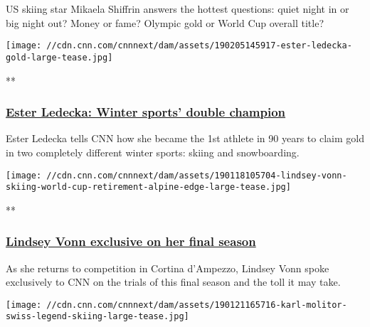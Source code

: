 US skiing star Mikaela Shiffrin answers the hottest questions: quiet
night in or big night out? Money or fame? Olympic gold or World Cup
overall title?

\href{/videos/sports/2019/02/05/ester-ledecka-double-olympic-medalist-pyeongchang-skiing-snowboarding-alpine-edge-spt-intl.cnn}{}

\texttt{[image: //cdn.cnn.com/cnnnext/dam/assets/190205145917-ester-ledecka-gold-large-tease.jpg]}

**

\hypertarget{ester-ledecka-winter-sports-double-champion}{%
\subsubsection{\texorpdfstring{\href{/videos/sports/2019/02/05/ester-ledecka-double-olympic-medalist-pyeongchang-skiing-snowboarding-alpine-edge-spt-intl.cnn}{Ester
Ledecka: Winter sports' double
champion}}{Ester Ledecka: Winter sports' double champion}}\label{ester-ledecka-winter-sports-double-champion}}

Ester Ledecka tells CNN how she became the 1st athlete in 90 years to
claim gold in two completely different winter sports: skiing and
snowboarding.

\href{/videos/sports/2019/01/18/lindsey-vonn-exclusive-final-season-world-cup-skiing-alpine-edge-vision-spt-intl.cnn}{}

\texttt{[image: //cdn.cnn.com/cnnnext/dam/assets/190118105704-lindsey-vonn-skiing-world-cup-retirement-alpine-edge-large-tease.jpg]}

**

\hypertarget{lindsey-vonn-exclusive-on-her-final-season}{%
\subsubsection{\texorpdfstring{\href{/videos/sports/2019/01/18/lindsey-vonn-exclusive-final-season-world-cup-skiing-alpine-edge-vision-spt-intl.cnn}{Lindsey
Vonn exclusive on her final
season}}{Lindsey Vonn exclusive on her final season}}\label{lindsey-vonn-exclusive-on-her-final-season}}

As she returns to competition in Cortina d'Ampezzo, Lindsey Vonn spoke
exclusively to CNN on the trials of this final season and the toll it
may take.

\href{/videos/sports/2019/01/21/karl-molitor-switzerland-skiing-legend-lauberhorn-alpine-edge-vision-spt-intl.cnn}{}

\texttt{[image: //cdn.cnn.com/cnnnext/dam/assets/190121165716-karl-molitor-swiss-legend-skiing-large-tease.jpg]}


